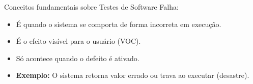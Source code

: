 \begin{frame}{Conceitos fundamentais sobre Testes de Software}
    Falha:
    \begin{itemize}
        \item É quando o sistema se comporta de forma incorreta em execução.
        \item É o efeito visível para o usuário (VOC).
        \item Só acontece quando o defeito é ativado.
        \item \textbf{Exemplo:} O sistema retorna valor errado ou trava ao executar (desastre).
    \end{itemize}
\end{frame}